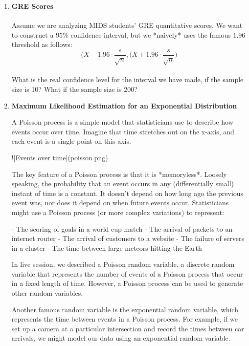 \documentclass[12pt,a4paper]{article}
\numberwithin{equation}{subsection}
\begin{document}
\begin{enumerate}

\item[]\textbf{GRE Scores} \\ \\
Assume we are analyzing MIDS students' GRE quantitative scores. We want to construct a $95\%$ confidence interval, but we *naively* uses the famous 1.96 threshold as follows:
\\
$$ \big( \bar{X} -1.96 \cdot \frac{s}{\sqrt{n}}, \big( \bar{X} +1.96 \cdot \frac{s}{\sqrt{n}} \big) $$
\\
What is the real confidence level for the interval we have made, if the sample size is 10?  What if the sample size is 200? 
 

\item[]\textbf{Maximum Likelihood Estimation for an Exponential Distribution}

A Poisson process is a simple model that statisticians use to describe how events occur over time.  Imagine that time stretches out on the x-axis, and each event is a single point on this axis.

![Events over time](poisson.png)

The key feature of a Poisson process is that it is *memoryless*.  Loosely speaking, the probability that an event occurs in any (differentially small) instant of time is a constant.  It doesn't depend on how long ago the previous event was, nor does it depend on when future events occur.  Statisticians might use a Poisson process (or more complex variations) to represent:

- The scoring of goals in a world cup match
- The arrival of packets to an internet router
- The arrival of customers to a website
- The failure of servers in a cluster
- The time between large meteors hitting the Earth

In live session, we described a Poisson random variable, a discrete random variable that represents the number of events of a Poisson process that occur in a fixed length of time.  However, a Poisson process can be used to generate other random variables.

Another famous random variable is the exponential random variable, which represents the time between events in a Poisson process.  For example, if we set up a camera at a particular intersection and record the times between car arrivals, we might model our data using an exponential random variable.


\end{enumerate}
\end{document}
